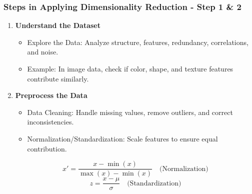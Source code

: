 \documentclass[aspectratio=169]{beamer}
\begin{document}
\begin{frame}[fragile]
    \frametitle{Steps in Applying Dimensionality Reduction - Step 1 & 2}
    
    \begin{enumerate}
        \item \textbf{Understand the Dataset}
        \begin{itemize}
            \item Explore the Data: Analyze structure, features, redundancy, correlations, and noise.
            \item Example: In image data, check if color, shape, and texture features contribute similarly.
        \end{itemize}
        
        \item \textbf{Preprocess the Data}
        \begin{itemize}
            \item Data Cleaning: Handle missing values, remove outliers, and correct inconsistencies.
            \item Normalization/Standardization: Scale features to ensure equal contribution.
        \end{itemize}
        
        \begin{equation}
        x' = \frac{x - \min(x)}{\max(x) - \min(x)} \quad \text{(Normalization)}
        \end{equation}
        \begin{equation}
        z = \frac{x - \mu}{\sigma} \quad \text{(Standardization)}
        \end{equation}
    \end{enumerate}
\end{frame}
\end{document}
